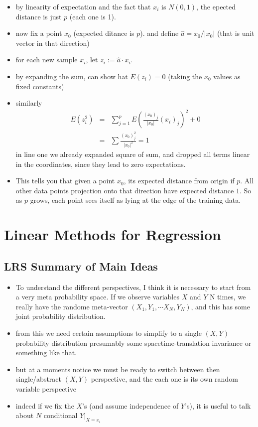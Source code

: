 \begin{itemize}
\begin{itemize}
      \item by linearity of expectation and the fact that $x_i$ is $N(0,1)$, the epected distance is just $p$ (each one is 1).
      \item now fix a point $x_0$ (expected ditance is $p$). and define $\hat{a} = x_0/|x_0|$ (that is unit vector in that direction)
      \item for each new sample $x_i$, let $z_i:= \hat{a} \cdot x_i$.
      \item by expanding the sum, can show hat $E(z_i) = 0$ (taking the $x_0$ values as fixed constants)
      \item similarly
	\begin{eqnarray}
	  E(z_i^2) &=&\sum_{j=1}^p E\left( \frac{(x_0)_j}{|x_0|} (x_i)_j\right)^2 + 0 \\
	   &=& \sum\frac{(x_0)_j^2}{|x_0|^2} = 1
	\end{eqnarray}
	in line one we already expanded square of sum, and dropped all terms linear in the coordinates, since they lead to zero expectations.
      \item This tells you that given a point $x_0$, its expected distance from origin if $p$. All other data points projection onto that direction have expected distance $1$. So as $p$ grows, each point sees itself as lying at the edge of the training data. 
    \end{itemize}
\end{itemize}


\chapter{Linear Methods for Regression}
\setcounter{section}{-1}
\section{LRS Summary of Main Ideas}
\begin{itemize}
  \item To understand the different perspectives, I think it is necessary to start from a very meta probability space. If we observe variables $X$ and $Y$ N times, we really have the randome meta-vector $(X_1, Y_1, \cdots X_N, Y_N)$, and this has some joint probability distribution.
  \item from this we need certain assumptions to simplify to a single $(X,Y)$ probability distribution
    \subitem presumably some spacetime-translation invariance or something like that.
  \item but at a moments notice we must be ready to switch between then single/abstract $(X,Y)$ perspective, and the each one is its own random variable perspective
  \item indeed if we fix the $X$'s (and assume independence of $Y$'s), it is useful to talk about $N$ conditional $Y|_{X=x_i}$
\end{itemize}

